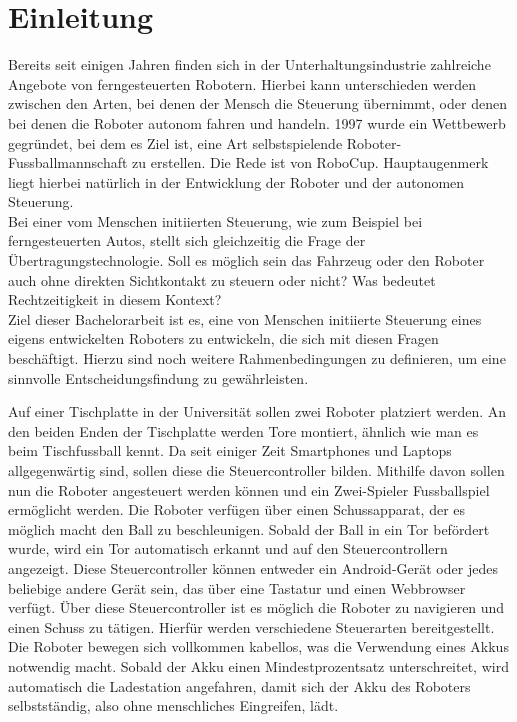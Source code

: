 \chapter{Einleitung}
\label{ch:einleitung}

Bereits seit einigen Jahren finden sich in der Unterhaltungsindustrie zahlreiche Angebote von ferngesteuerten Robotern. Hierbei kann unterschieden werden zwischen den Arten, bei denen der Mensch die Steuerung übernimmt, oder denen bei denen die Roboter autonom fahren und handeln. 1997 wurde ein Wettbewerb gegründet, bei dem es Ziel ist, eine Art selbstspielende Roboter-Fussballmannschaft zu erstellen. Die Rede ist von RoboCup. Hauptaugenmerk liegt hierbei natürlich in der Entwicklung der Roboter und der autonomen Steuerung. \\
Bei einer vom Menschen initiierten Steuerung, wie zum Beispiel bei ferngesteuerten Autos, stellt sich gleichzeitig die Frage der Übertragungstechnologie. Soll es möglich sein das Fahrzeug oder den Roboter auch ohne direkten Sichtkontakt zu steuern oder nicht? Was bedeutet Rechtzeitigkeit in diesem Kontext? \\
Ziel dieser Bachelorarbeit ist es, eine von Menschen initiierte Steuerung eines eigens entwickelten Roboters zu entwickeln, die sich mit diesen Fragen beschäftigt. Hierzu sind noch weitere Rahmenbedingungen zu definieren, um eine sinnvolle Entscheidungsfindung zu gewährleisten.


Auf einer Tischplatte in der Universität sollen zwei Roboter platziert werden. An den beiden Enden der Tischplatte werden Tore montiert, ähnlich wie man es beim Tischfussball kennt. Da seit einiger Zeit Smartphones und Laptops allgegenwärtig sind, sollen diese die Steuercontroller bilden. Mithilfe davon sollen nun die Roboter angesteuert werden können und ein Zwei-Spieler Fussballspiel ermöglicht werden. Die Roboter verfügen über einen Schussapparat, der es möglich macht den Ball zu beschleunigen. Sobald der Ball in ein Tor befördert wurde, wird ein Tor automatisch erkannt und auf den Steuercontrollern angezeigt. Diese Steuercontroller können entweder ein Android-Gerät oder jedes beliebige andere Gerät sein, das über eine Tastatur und einen Webbrowser verfügt. Über diese Steuercontroller ist es möglich die Roboter zu navigieren und einen Schuss zu tätigen. Hierfür werden verschiedene Steuerarten bereitgestellt. 
Die Roboter bewegen sich vollkommen kabellos, was die Verwendung eines Akkus notwendig macht. Sobald der Akku einen Mindestprozentsatz unterschreitet, wird automatisch die Ladestation angefahren, damit sich der Akku des Roboters selbstständig, also ohne menschliches Eingreifen, lädt.\\


